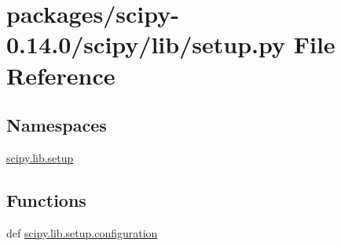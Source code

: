 \hypertarget{packages_2scipy-0_814_80_2scipy_2lib_2setup_8py}{}\section{packages/scipy-\/0.14.0/scipy/lib/setup.py File Reference}
\label{packages_2scipy-0_814_80_2scipy_2lib_2setup_8py}
\subsection*{Namespaces}
\begin{DoxyCompactItemize}
\item 
 \hyperlink{namespacescipy_1_1lib_1_1setup}{scipy.\+lib.\+setup}
\end{DoxyCompactItemize}
\subsection*{Functions}
\begin{DoxyCompactItemize}
\item 
def \hyperlink{namespacescipy_1_1lib_1_1setup_aa0f9a1638dcb4f5d5a258e260f4acd09}{scipy.\+lib.\+setup.\+configuration}
\end{DoxyCompactItemize}
